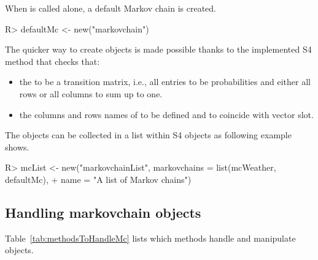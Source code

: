 \documentclass[nojss]{jss}
\begin{document}
When  is called alone, a default Markov chain is created.

\begin{Schunk}
\begin{Sinput}
R> defaultMc <- new("markovchain")
\end{Sinput}
\end{Schunk}

The quicker way to create  objects is made possible thanks to
the implemented  S4 method that checks that:

\begin{itemize}
  \item the  to be a transition matrix, i.e., all entries to be probabilities and either all rows or all columns to sum up to one.
  \item the columns and rows names of  to be defined and to coincide with  vector slot. 
\end{itemize}

The  objects can be collected in a list within  S4 objects as following example shows.

\begin{Schunk}
\begin{Sinput}
R> mcList <- new("markovchainList", markovchains = list(mcWeather, defaultMc), 
+  		name = "A list of Markov chains")
\end{Sinput}
\end{Schunk}



\subsection{Handling markovchain objects}

Table~\ref{tab:methodsToHandleMc} lists which methods handle and 
manipulate  objects.
\end{document}
